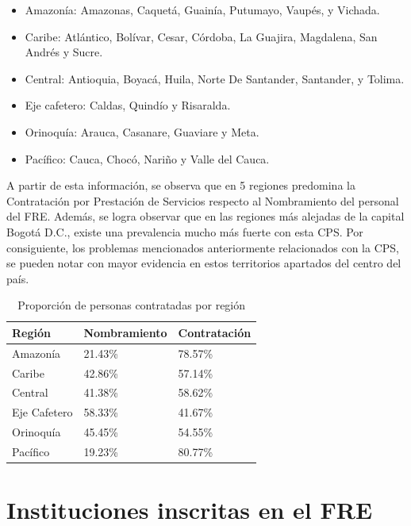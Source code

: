 \documentclass[
  oneside]{book}
\providecommand{\tightlist}{%
  \setlength{\itemsep}{0pt}\setlength{\parskip}{0pt}}
\begin{document}
\begin{itemize}
\tightlist
\item
  Amazonía: Amazonas, Caquetá, Guainía, Putumayo, Vaupés, y Vichada.
\item
  Caribe: Atlántico, Bolívar, Cesar, Córdoba, La Guajira, Magdalena, San Andrés y Sucre.
\item
  Central: Antioquia, Boyacá, Huila, Norte De Santander, Santander, y Tolima.
\item
  Eje cafetero: Caldas, Quindío y Risaralda.
\item
  Orinoquía: Arauca, Casanare, Guaviare y Meta.
\item
  Pacífico: Cauca, Chocó, Nariño y Valle del Cauca.
\end{itemize}

A partir de esta información, se observa que en 5 regiones predomina la Contratación por Prestación de Servicios respecto al Nombramiento del personal del FRE. Además, se logra observar que en las regiones más alejadas de la capital Bogotá D.C., existe una prevalencia mucho más fuerte con esta CPS. Por consiguiente, los problemas mencionados anteriormente relacionados con la CPS, se pueden notar con mayor evidencia en estos territorios apartados del centro del país.

\begin{table}

\caption{\label{tab:CaracterizacionIngreso1}Proporción de personas contratadas por región}
\centering
\begin{tabular}[t]{lll}
\toprule
Región & Nombramiento & Contratación\\
\midrule
Amazonía & 21.43\% & 78.57\%\\
Caribe & 42.86\% & 57.14\%\\
Central & 41.38\% & 58.62\%\\
Eje Cafetero & 58.33\% & 41.67\%\\
Orinoquía & 45.45\% & 54.55\%\\
\addlinespace
Pacífico & 19.23\% & 80.77\%\\
\bottomrule
\end{tabular}
\end{table}

\hypertarget{instituciones-inscritas-en-el-fre}{%
\section{Instituciones inscritas en el FRE}\label{instituciones-inscritas-en-el-fre}}
\end{document}

